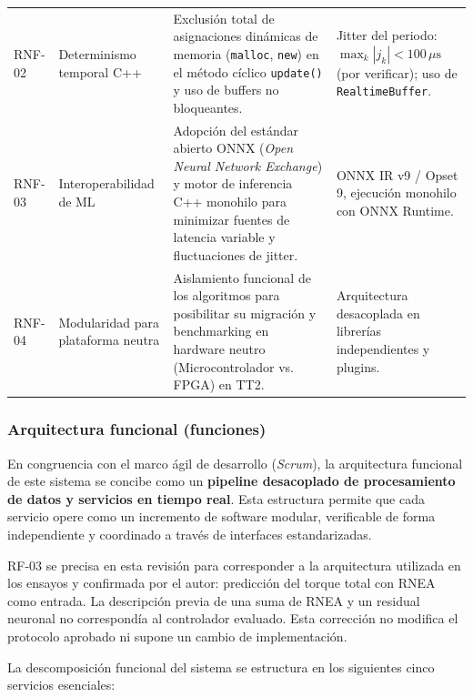 \documentclass[12pt]{article}
\begin{document}
\begin{table}[htbp]
\begin{tabularx}{\textwidth}{l p{2.8cm} X p{3.2cm}}
RNF-02 & Determinismo temporal C++ & Exclusión total de asignaciones dinámicas de memoria (\texttt{malloc}, \texttt{new}) en el método cíclico \texttt{update()} y uso de buffers no bloqueantes. & Jitter del periodo: $\max_k |j_k| < 100\,\mu\text{s}$ (por verificar); uso de \texttt{RealtimeBuffer}. \\
RNF-03 & Interoperabilidad de ML & Adopción del estándar abierto ONNX (\textit{Open Neural Network Exchange}) y motor de inferencia C++ monohilo para minimizar fuentes de latencia variable y fluctuaciones de jitter. & ONNX IR v9 / Opset 9, ejecución monohilo con ONNX Runtime. \\
RNF-04 & Modularidad para plataforma neutra & Aislamiento funcional de los algoritmos para posibilitar su migración y benchmarking en hardware neutro (Microcontrolador vs. FPGA) en TT2. & Arquitectura desacoplada en librerías independientes y plugins. \\
\bottomrule
\end{tabularx}
\end{table}

\subsubsection{Arquitectura funcional (funciones)}
\label{sssec:arquitectura_funcional}

En congruencia con el marco ágil de desarrollo (\textit{Scrum}), la arquitectura funcional de este sistema se concibe como un \textbf{pipeline desacoplado de procesamiento de datos y servicios en tiempo real}. Esta estructura permite que cada servicio opere como un incremento de software modular, verificable de forma independiente y coordinado a través de interfaces estandarizadas.

RF-03 se precisa en esta revisión para corresponder a la arquitectura utilizada en los ensayos y confirmada por el autor: predicción del torque total con RNEA como entrada. La descripción previa de una suma de RNEA y un residual neuronal no correspondía al controlador evaluado. Esta corrección no modifica el protocolo aprobado ni supone un cambio de implementación.

La descomposición funcional del sistema se estructura en los siguientes cinco servicios esenciales:
\end{document}
